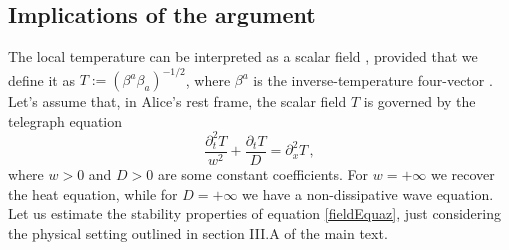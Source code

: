 \documentclass[a4paper, amsfonts, amssymb, amsmath, reprint, showkeys,  twoside, onecolumn,notitlepage,nofootinbib]{revtex4-1}
\theoremstyle{definition}
\theoremstyle{theorem}
\begin{document}
\subsection*{Implications of the argument}

The local temperature can be interpreted as a scalar field \cite{MTW_book}, provided that we define it as $T:=(\beta^a \beta_a)^{-1/2}$, where $\beta^a$ is the inverse-temperature four-vector \cite{Israel_2009_inbook,Becattini2016,GavassinoTermometri2020}.
Let's assume that, in Alice's rest frame, the scalar field $T$ is governed by the telegraph equation
\begin{equation}\label{fieldEquaz}
\dfrac{\partial_t^2 T}{w^2}+\dfrac{\partial_t T}{D} = \partial_x^2 T \, ,
\end{equation}
where $w>0$ and $D>0$ are some constant coefficients. For $w=+\infty$ we recover the heat equation, while for $D=+\infty$ we have a non-dissipative wave equation. Let us estimate the stability properties of equation \eqref{fieldEquaz}, just considering the physical setting outlined in section III.A of the main text.
\end{document}
